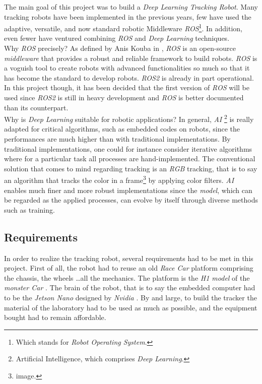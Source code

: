 		The main goal of this project was to build a \textit{Deep Learning Tracking Robot}. Many tracking
		robots have been implemented in the previous years, few have used the adaptive, versatile, and 
		now standard robotic Middleware \textit{ROS}\footnote{Which stands for \textit{Robot Operating System}.}.
		In addition, even fewer have ventured combining \textit{ROS} and \textit{Deep Learning} techniques.
		\\\indent Why \textit{ROS} precisely? As defined by Anis Kouba in \cite{ros}, \textit{ROS}
		is an \frstg{} open-source \textit{middleware} \lstg{} that provides a robust and reliable framework 
		to build robots. \textit{ROS} is a voguish tool to create robots with advanced functionalities so much so 
		that it has become the standard to develop robots. \textit{ROS2} is already in part 
		operational. In this project though, 
		it has been decided that the first version of \textit{ROS} will be used since \textit{ROS2} is still 
		in heavy development and \textit{ROS} is better documented than its counterpart.
		\\\indent Why is \textit{Deep Learning} suitable for robotic applications? In general, \textit{AI}
		\footnote{Artificial Intelligence, which comprises \textit{Deep Learning}.}
		is really adapted for critical algorithms, such as embedded codes
		on robots, since the performances are much higher than with traditional implementations. By traditional
		implementations, one could for instance consider iterative algorithms where for a particular task 
		all processes are hand-implemented. The conventional solution 
		that comes to mind regarding tracking is an \textit{RGB} tracking, that is to say an 
		algorithm that tracks the color in a frame\footnote{image.} by applying 
		color filters. \textit{AI} enables much finer and more robust
		implementations since the \textit{model},
		which can be regarded as the applied processes, can evolve by itself through diverse methods such as training.
		 
		\subsection{Requirements}
		
		In order to realize the tracking robot, several requirements had to be met in this
		project. First of all, the robot had to reuse an old \textit{Race Car} platform comprising
		the chassis, the wheels \dots all the mechanics. The platform is the \textit{H1 model}
		of the \textit{monster Car} \cite{datasheet}.
		The brain of the robot, that is to say 
		the embedded computer had to be the \textit{Jetson Nano} designed by \textit{Nvidia} \cite{nano}. By and
		large, to build the tracker the material of the laboratory had to be used as much as 
		possible, and the equipment bought had to remain affordable.
	
